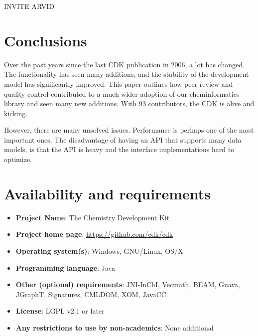 \documentclass[10pt]{bmcart}
\begin{document}
INVITE ARVID


\section*{Conclusions}

Over the past years since the last CDK publication in 2006, a lot has changed. The functionality
has seen many additions, and the stability of the development model has significantly improved.
This paper outlines how peer review and quality control contributed to a much wider adoption
of our cheminformatics library and seen many new additions. With 93 contributors,
the CDK is alive and kicking.

However, there are many unsolved issues. Performance is perhaps one of the most important ones.
The disadvantage of having an API that supports many data models, is that the API is heavy and
the interface implementations hard to optimize.

\section*{Availability and requirements}

\begin{itemize}
\item \textbf{Project Name}: The Chemistry Development Kit
\item \textbf{Project home page}: \url{https://github.com/cdk/cdk}
\item \textbf{Operating system(s)}: Windows, GNU/Linux, OS/X
\item \textbf{Programming language}: Java
\item \textbf{Other (optional) requirements}: JNI-InChI, Vecmath, BEAM, Guava, JGraphT, Signatures, CMLDOM, XOM, JavaCC
\item \textbf{License}: LGPL v2.1 or later
\item \textbf{Any restrictions to use by non-academics}: None additional
\end{itemize}

\end{document}
